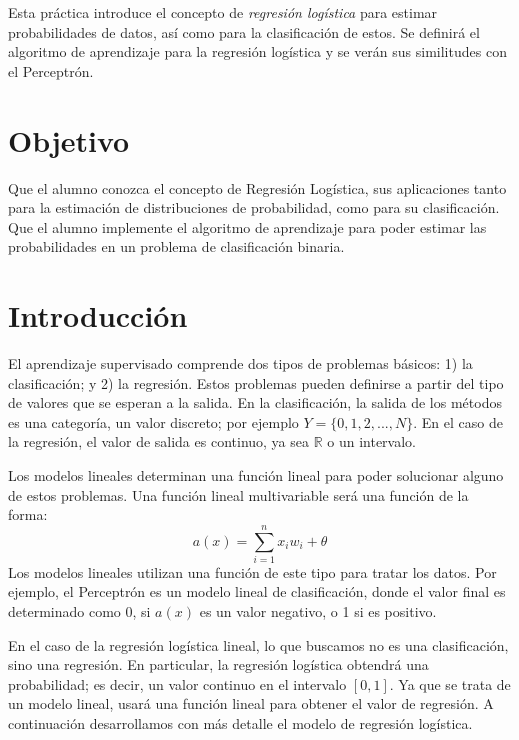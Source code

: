 
Esta práctica introduce el concepto de \emph{regresión logística} para estimar probabilidades de datos, así como para la clasificación de estos. Se definirá el algoritmo de aprendizaje para la regresión logística y se verán sus similitudes con el Perceptrón.


\section{Objetivo}

Que el alumno conozca el concepto de Regresión Logística, sus aplicaciones tanto para la estimación de distribuciones de probabilidad, como para su clasificación. Que el alumno implemente el algoritmo de aprendizaje para poder estimar las probabilidades en un problema de clasificación binaria.

\section{Introducción}

El aprendizaje supervisado comprende dos tipos de problemas básicos: 1) la clasificación; y 2) la regresión. Estos problemas pueden definirse a partir del tipo de valores que se esperan a la salida. En la clasificación, la salida de los métodos es una categoría, un valor discreto; por ejemplo $Y = \{0,1,2,...,N\}$. En el caso de la regresión, el valor de salida es continuo, ya sea $\mathbb{R}$ o un intervalo.

Los modelos lineales determinan una función lineal para poder solucionar alguno de estos problemas. Una función lineal multivariable será una función de la forma: $$a(x) = \sum_{i=1}^n x_iw_i + \theta$$
Los modelos lineales utilizan una función de este tipo para tratar los datos. Por ejemplo, el Perceptrón es un modelo lineal de clasificación, donde el valor final es determinado como 0, si $a(x)$ es un valor negativo, o 1 si es positivo.

En el caso de la regresión logística lineal, lo que buscamos no es una clasificación, sino una regresión. En particular, la regresión logística obtendrá una probabilidad; es decir, un valor continuo en el intervalo $[0,1]$. Ya que se trata de un modelo lineal, usará una función lineal para obtener el valor de regresión. A continuación desarrollamos con más detalle el modelo de regresión logística.


